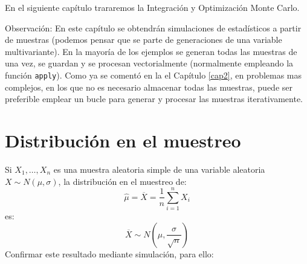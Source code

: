 \documentclass[
]{book}
\theoremstyle{break}
\theoremstyle{definition}
\theoremstyle{definition}
\theoremstyle{definition}
\theoremstyle{remark}
\let\BeginKnitrBlock\begin \let\EndKnitrBlock\end
\begin{document}
En el siguiente capítulo trararemos la Integración y Optimización Monte Carlo.

Observación:
En este capítulo se obtendrán simulaciones de estadísticos a partir de muestras (podemos pensar que se parte de generaciones de una variable multivariante).
En la mayoría de los ejemplos se generan todas las muestras de una vez, se guardan y se procesan vectorialmente (normalmente empleando la función \texttt{apply}).
Como ya se comentó en la el Capítulo \ref{cap2}, en problemas mas complejos, en los que no es necesario almacenar todas las muestras, puede ser preferible emplear un bucle para generar y procesar las muestras iterativamente.

\hypertarget{distribuciuxf3n-en-el-muestreo}{%
\section{Distribución en el muestreo}\label{distribuciuxf3n-en-el-muestreo}}

\BeginKnitrBlock{exercise}
\protect\hypertarget{exr:unnamed-chunk-2}{}{\label{exr:unnamed-chunk-2} }
\EndKnitrBlock{exercise}

Si \(X_{1},\ldots,X_{n}\) es una muestra aleatoria simple de una
variable aleatoria \(X \sim N\left( \mu, \sigma \right)\), la
distribución en el muestreo de:
\[\hat{\mu}=\overline{X}=\dfrac{1}{n}\sum_{i=1}^{n}X_{i}\]
es:
\[\overline{X} \sim N\left(  \mu,\dfrac{\sigma}{\sqrt{n}}\right)\]
Confirmar este resultado mediante simulación, para ello:
\end{document}

